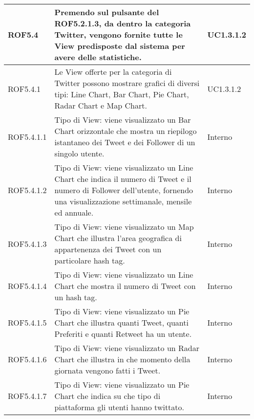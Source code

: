 \begin{center}
\begin{longtable}{| p{2.5cm} | p{8cm} | p{2cm} |}
		ROF5.4  &  Premendo sul pulsante del ROF5.2.1.3, da dentro la categoria Twitter, vengono fornite tutte le View predisposte dal sistema per avere delle statistiche. &  UC1.3.1.2  \\
		\hline
		ROF5.4.1  & Le View offerte per la categoria di Twitter possono mostrare grafici di diversi tipi: Line Chart, Bar Chart, Pie Chart, Radar Chart e Map Chart.  &  UC1.3.1.2  \\
		\hline
		ROF5.4.1.1  &  Tipo di View: viene visualizzato un Bar Chart orizzontale che mostra un riepilogo istantaneo dei Tweet e dei Follower di un singolo utente. & Interno \\
		\hline
		ROF5.4.1.2  &  Tipo di View: viene visualizzato un Line Chart che indica il numero di Tweet e il numero di Follower dell'utente, fornendo una visualizzazione settimanale, mensile ed annuale. & Interno \\
		\hline
		ROF5.4.1.3  &  Tipo di View: viene visualizzato un Map Chart che illustra l'area geografica di appartenenza dei Tweet con un particolare hash tag. & Interno \\
		\hline
		ROF5.4.1.4  &  Tipo di View: viene visualizzato un Line Chart che mostra il numero di Tweet con un hash tag.  & Interno \\
		\hline
		ROF5.4.1.5  &  Tipo di View: viene visualizzato un Pie Chart che illustra quanti Tweet, quanti Preferiti e quanti Retweet ha un utente. & Interno \\
		\hline
		ROF5.4.1.6  &  Tipo di View: viene visualizzato un Radar Chart che illustra in che momento della giornata vengono fatti i Tweet. & Interno \\
		\hline
		ROF5.4.1.7  &  Tipo di View: viene visualizzato un Pie Chart che indica su che tipo di piattaforma gli utenti hanno twittato. & Interno \\
		\hline



\end{longtable}
\end{center}
